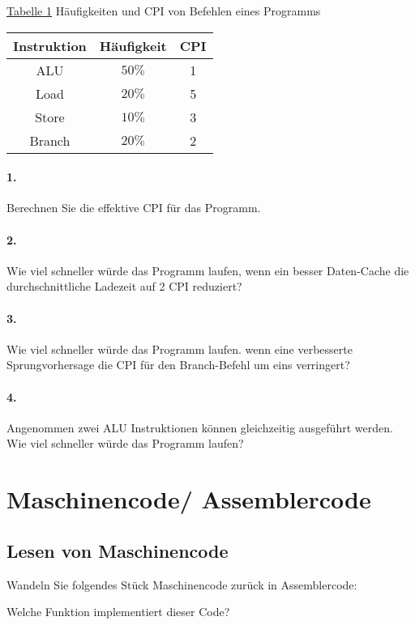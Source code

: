 \documentclass[paper=a4, fontsize=11pt]{scrartcl}
\numberwithin{equation}{section}
\numberwithin{figure}{section}
\numberwithin{table}{section}
\begin{document}
\underline{Tabelle 1}
Häufigkeiten und CPI von Befehlen eines Programms
\begin{tabular}{c|c|c}
Instruktion & Häufigkeit & CPI \\
\hline
ALU & $50 \%$ & 1 \\
\hline
Load & $20 \%$ & 5 \\
\hline
Store & $10 \%$ & 3 \\
\hline
Branch & $20 \%$ & 2 \\
\end{tabular}

\paragraph{1.}
Berechnen Sie die effektive CPI für das Programm.

\paragraph{2.}
Wie viel schneller würde das Programm laufen, wenn ein besser Daten-Cache die durchschnittliche Ladezeit auf 2 CPI reduziert?

\paragraph{3.}
Wie viel schneller würde das Programm laufen. wenn eine verbesserte Sprungvorhersage die CPI für den Branch-Befehl um eins verringert?

\paragraph{4.}
Angenommen zwei ALU Instruktionen können gleichzeitig ausgeführt werden. Wie viel schneller würde das Programm laufen?

\section{Maschinencode/ Assemblercode}
\subsection{Lesen von Maschinencode}
Wandeln Sie folgendes Stück Maschinencode zurück in Assemblercode:

Welche Funktion implementiert dieser Code?

\end{document}
